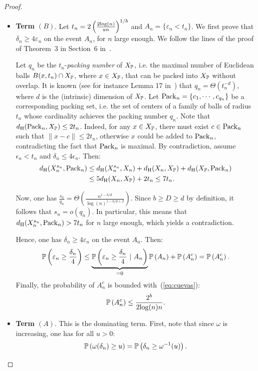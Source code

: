 \begin{proof}
\begin{itemize}
\item {\bf Term $(B)$}.
Let $t_n=2\left(\frac{2{\log}(n)}{a n}\right)^{1/b}$ and $A_n=\{\varepsilon_n < t_n\}$.
We first prove that $\delta_n\geq 4\varepsilon_n$ on the event $A_n$, for $n$ large enough.
We follow the lines of the proof of Theorem~3 in Section~6 in~\cite{Fasy14}.  

Let $q_n$ be the $t_n$-{\em packing number} of $X_{\mathbb{P}}$, i.e. the maximal number of Euclidean balls $B(x,t_n)\cap X_{\mathbb{P}}$, where $x\in X_{\mathbb{P}}$,
that can be packed into $X_{\mathbb{P}}$ without overlap. It is known (see for instance Lemma 17 in~\cite{Fasy14}) that $q_n=\Theta(t_n^{-d})$, where $d$ is the (intrinsic) dimension of $X_{\mathbb{P}}$.
Let ${\rm Pack}_n=\{c_1,\cdots,c_{q_n}\}$ be a corresponding packing set, i.e. the set of centers of a family of balls of radius $t_n$
whose cardinality achieves the packing number $q_n$. 
Note that $d_{\rm H}({\rm Pack}_n,X_{\mathbb{P}}) \leq 2t_n$. Indeed, for any $x\in X_{\mathbb{P}}$, there must exist $c\in{\rm Pack}_n$ such that $\|x-c\|\leq 2t_n$, otherwise
$x$ could be added to ${\rm Pack}_n$, contradicting the fact that ${\rm Pack}_n$ is maximal.
By contradiction, assume $\epsilon_n < t_n$ and $\delta_n\leq 4\epsilon_n$. Then:
\begin{align*}
d_{\rm H}(X_n^{s_n},{\rm Pack}_n) & \leq d_{\rm H}(X_n^{s_n},X_n) + d_{\rm H}(X_n,X_{\mathbb{P}}) + d_{\rm H}(X_{\mathbb{P}},{\rm Pack}_n) \\
&  \leq 5d_{\rm H}(X_n,X_{\mathbb{P}}) + 2t_n \leq 7t_n.
\end{align*}

Now, one has $\frac{s_n}{q_n}=\Theta\left(\frac{n^{1-b/d}}{\log(n)^{1-b/d+\beta}}\right)$. Since $b\geq D\geq d$ by definition, it follows that $s_n=o(q_n)$.
In particular, this means that $d_{\rm H}(X_n^{s_n},{\rm Pack}_n)> 7t_n$ for $n$ large enough, which yields a contradiction. 

Hence, one has $\delta_n\geq 4\varepsilon_n$ on the event $A_n$. %
Then:
$$\proba{\varepsilon_n\geq\frac{\delta_n}{4}}\leq \underbrace{\proba{\varepsilon_n\geq\frac{\delta_n}{4}\ |\ A_n}}_{=0}\proba{A_n} + \proba{A_n^c} = \proba{A_n^c}.$$
Finally, the probability of $A_n^c$ is bounded with~(\ref{eq:cuevas}): 
$$\mathbb{P}\left(A_n^c\right)\leq\frac{2^{b}}{2{\log}(n)n}.$$ 

\item {\bf Term $(A)$}.
This is the dominating term. First, note that since $\omega$ is increasing, one has for all $u > 0$:
\begin{equation}\label{eq:omega}\mathbb{P}\left(\omega(\delta_n)\geq u\right)=\mathbb{P}\left(\delta_n\geq \omega^{-1}(u)\right).\end{equation}


\end{itemize}
\end{proof}

